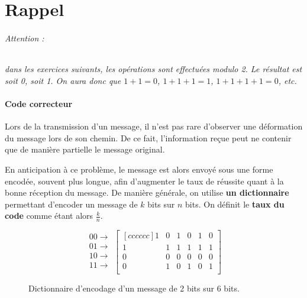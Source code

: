\documentclass [a4paper, 11pt] {article}
\begin{document}
    \makeseancetitle
    \thispagestyle{firstpage}
    
    \part*{Rappel}
    
    \paragraph{Attention :} \textit{dans les exercices suivants, les opérations sont effectuées modulo 2. Le résultat est soit 0, soit 1. On aura donc que $1 + 1 = 0$, $1+1+1 =1$, $1+1+1 +1 =0$, etc.}
    
    \subsection*{Code correcteur}
    
    Lors de la transmission d'un message, il n'est pas rare d'observer une déformation du message lors de son chemin. De ce fait, l'information reçue peut ne contenir que de manière partielle le message original.
    
    En anticipation à ce problème, le message est alors envoyé sous une forme encodée, souvent plus longue, afin d'augmenter le taux de réussite quant à la bonne réception du message. De manière générale, on utilise \textbf{un dictionnaire} permettant d'encoder un message de $k$ bits sur $n$ bits. On définit le \textbf{taux du code} comme étant alors $\frac{k}{n}$.
    
    \begin{figure}[H]
        \centering
        \begin{equation*}
            \begin{matrix}
                00 \rightarrow \\
                01 \rightarrow\\
                10 \rightarrow\\
                11 \rightarrow\\
            \end{matrix}
            \begin{bmatrix}[cccccc]
               1 & 0 &  1 &  0 &  1 &  0 \\
               1 & 1 &  1 &  1 &  1 &  1\\
               0 & 0 &  0 &  0 &  0 &  0\\
               0 & 1 &  0 &  1 &  0 &  1\\
            \end{bmatrix}
        \end{equation*}
        \caption{Dictionnaire d'encodage d'un message de 2 bits sur 6 bits.}
        \label{fig:encodage}
    \end{figure}
    
\end{document}
